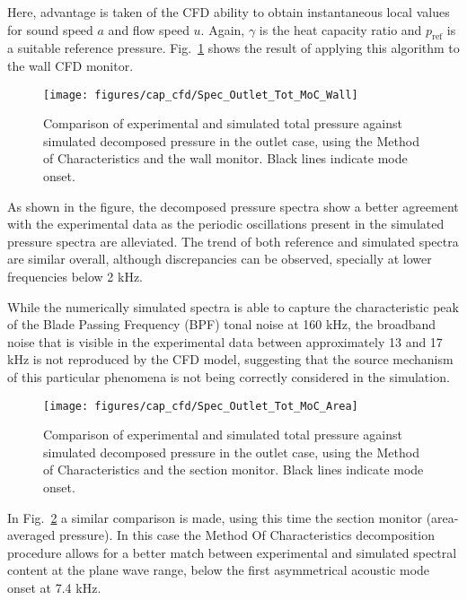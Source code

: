 Here, advantage is taken of the CFD ability to obtain instantaneous local values for sound speed $a$ and flow speed $u$. Again, $\gamma$ is the heat capacity ratio and $p_\text{ref}$ is a suitable reference pressure. Fig.~\ref{fig:cfd_Spec_Outlet_Tot_Moc_Wall} shows the result of applying this algorithm to the wall CFD monitor.

\begin{figure}[htb!]
\centering
\texttt{[image: figures/cap\_cfd/Spec\_Outlet\_Tot\_MoC\_Wall]}
\caption{Comparison of experimental and simulated total pressure against simulated decomposed pressure in the outlet case, using the Method of Characteristics and the wall monitor. Black lines indicate mode onset.}
\label{fig:cfd_Spec_Outlet_Tot_Moc_Wall}
\end{figure}

As shown in the figure, the decomposed pressure spectra show a better agreement with the experimental data as the periodic oscillations present in the simulated pressure spectra are alleviated. The trend of both reference and simulated spectra are similar overall, although discrepancies can be observed, specially at lower frequencies below 2 kHz. 

While the numerically simulated spectra is able to capture the characteristic peak of the Blade Passing Frequency (BPF) tonal noise at 160 kHz, the broadband noise that is visible in the experimental data between approximately 13 and 17 kHz is not reproduced by the CFD model, suggesting that the source mechanism of this particular phenomena is not being correctly considered in the simulation.

\begin{figure}[htb!]
\centering
\texttt{[image: figures/cap\_cfd/Spec\_Outlet\_Tot\_MoC\_Area]}
\caption{Comparison of experimental and simulated total pressure against simulated decomposed pressure in the outlet case, using the Method of Characteristics and the section monitor. Black lines indicate mode onset.}
\label{fig:cfd_Spec_Outlet_Tot_Moc_Area}
\end{figure}

In Fig.~\ref{fig:cfd_Spec_Outlet_Tot_Moc_Area} a similar comparison is made, using this time the section monitor (area-averaged pressure). In this case the Method Of Characteristics decomposition procedure allows for a better match between experimental and simulated spectral content at the plane wave range, below the first asymmetrical acoustic mode onset at 7.4 kHz.

